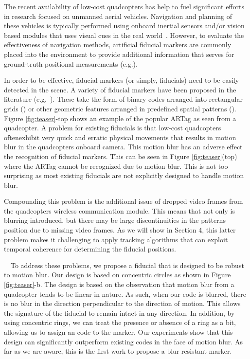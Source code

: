 \documentclass[runningheads]{llncs}
\begin{document}
The recent availability of low-cost quadcopters has help to fuel significant efforts in
research focused on unmanned aerial vehicles.  Navigation and planning of
these vehicles is typically performed using onboard inertial sensors and/or
vision based modules that uses visual cues in the real world~\cite{Davison:2007}.
However, to evaluate the effectiveness of navigation methods, artificial
fiducial markers are commonly placed into the environment to provide
additional information that serves for ground-truth
positional measurements (e.g.\cite{Bosnak:2012,Lim09,Klopschitz:2007}).

In order to be effective, fiducial markers (or simply, fiducials) need
to be easily detected in the scene.  A variety of fiducial markers
have been proposed in the literature (e.g.~\cite{NaimarkF02,ARToolkit02,Fiala05,Pitag13,runetag11}).
These take the form of binary codes arranged into rectangular grids (\cite{ARToolkit02,Fiala05})
or other geometric features arranged in predefined spatial patterns
(\cite{NaimarkF02,Pitag13,runetag11}).
Figure \ref{fig:teaser}-top shows an example of the popular ARTag\cite{Fiala05} as
seen from a quadcopter.  A problem for existing fiducials is  that low-cost quadcopters
oftenexhibit very quick and erratic physical movements that
results in motion blur in the quadcopters onboard camera.  This motion blur has an adverse effect the  recognition of fiducial  markers.  This can be seen in Figure
\ref{fig:teaser}(top) where the ARTag cannot be recognized due to motion blur. This is not too surprising as most  existing fiducials are not explicitly designed to handle motion blur.

Compounding this problem is the additional issue of dropped video frames from the quadcopters
wireless communication module.   This means that not only is blurring
introduced, but there may be large discontinuities in the patterns position due
to missing video frames.  As we will show in Section 4, this latter problem makes it challenging to apply tracking algorithms that can exploit temporal coherence for determining
the fiducial positions.

~~To address these problems, we propose a
fiducial that is designed to be robust to motion blur.  Our design is based on
concentric circles as shown in Figure \ref{fig:teaser}-b.  The design is based
on the observation that motion blur from a quadcopter tends to be linear in
nature.  As such, when our code is blurred, there is no blur in the direction
perpendicular to the direction of motion.   This allows the signature of the
fiducial to remain intact in any direction.  In addition, by using concentric
rings, we can treat the presence or absence of a ring as a bit, allowing us to
assign an code to the marker.  Our experiments show that this design can
significantly outperform existing codes in the face of motion blur. As far as
we are aware, this is the first work to propose a blur resistant marker.
\end{document}
